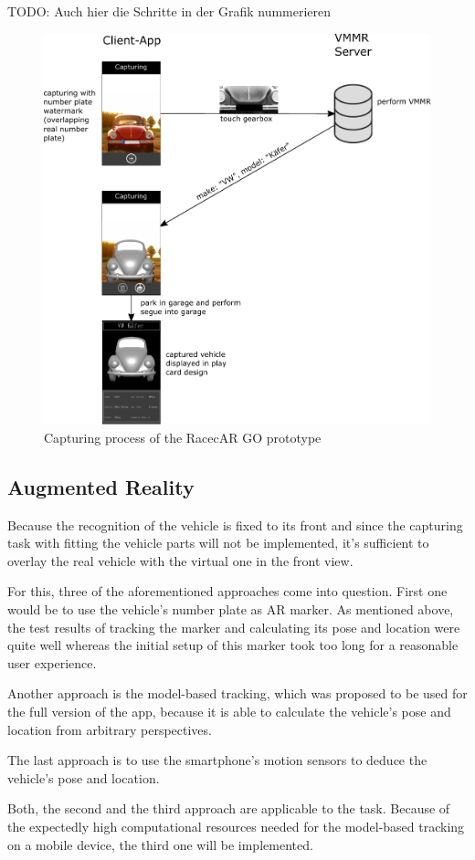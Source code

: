 TODO: Auch hier die Schritte in der Grafik nummerieren
\begin{figure}[btph]
  \centering
        \includegraphics[width=.75\linewidth]{gfx/capturing_limited}
        \caption{Capturing process of the RacecAR GO prototype}
        \label{fig:capturingLimited}
\end{figure}

\subsection{Augmented Reality}
Because the recognition of the vehicle is fixed to its front and since the capturing task with fitting the vehicle parts will not be implemented, it's sufficient to overlay the real vehicle with the virtual one in the front view.

For this, three of the aforementioned approaches come into question. First one would be to use the vehicle's number plate as AR marker. As mentioned above, the test results of tracking the marker and calculating its pose and location were quite well whereas the initial setup of this marker took too long for a reasonable user experience.

Another approach is the model-based tracking, which was proposed to be used for the full version of the app, because it is able to calculate the vehicle's pose and location from arbitrary perspectives.

The last approach is to use the smartphone's motion sensors to deduce the vehicle's pose and location.

Both, the second and the third approach are applicable to the task. Because of the expectedly high computational resources needed for the model-based tracking on a mobile device, the third one will be implemented.


